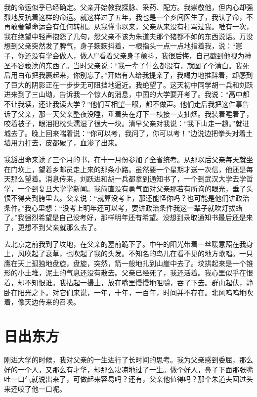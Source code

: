 \documentclass[12pt,oneside]{book}
\begin{document}
我的命运似乎已经确定。父亲开始教我探脉、采药、配方。我崇敬他，但内心却强烈地反抗着这样的命运。就这样过了五年，我也是一个乡间医生了，我认了命，不再敢奢望命运会有任何转机。从我懂事以来，父亲从来没有打骂过我。唯有一次，我在绝望中轻声抱怨了几句，怨父亲不该为朱道夫那个猪都不如的东西说话。万没想到父亲突然发了脾气，身子簌簌抖着，一根指头一点一点地指着我，说：``崽子，你还没有学会做人，做人!''看着父亲身子颤抖，我很后悔，自己戳到他视为神圣不容亵渎的东西了。当时父亲说：``我一辈子什么都没有，就图了个清白。我死后用白布把我裹起来，你别忘了。''开始有人给我提亲了，我竭力地推辞着，却感到了巨大的阴影正在一步步无可阻挡地逼近。我绝望了。这天初中同学胡一兵和刘跃进来到了三山坳，告诉我一个惊人的消息，中国的大学要开考了。我说：``高中都不让我读，还让我读大学？''他们互相望一眼，都不做声。他们走后我把这件事告诉了父亲，那一天父亲整夜没睡，垂着头在灯下一枝接一支抽烟。我装着睡着了，咬着被子，眼泪把枕头濡湿了很大一块。清早父亲对我说：``我下山走一趟。''就进城去了。晚上回来喘着说：``你可以考，我问了，你可以考！''边说边把拳头对着土墙用力打去，皮都破了，血渗了出来。

我豁出命来读了三个月的书，在十一月份参加了全省统考。从那以后父亲每天就坐在门坎上，望着乡邮员走上来的那条小路。虽然要一个星期才送一次信，他还是每天那么望着。消息传来，刘跃进和胡一兵都拿到通知书了，一个到武汉大学去学哲学，一个到复旦大学学新闻。我简直没有勇气面对父亲那若有所询的眼光，垂了头恨不得夹到胯里去。父亲说：``就算没考上，那还能怪你吗？也可能是他们讲政治条件。''我心里想：``没考上明年还可以考，要讲政治条件我这一辈子就吹灯拔蜡了。''我强烈希望是自己没考好，那样明年还有希望。没想到录取通知书最后还是来了，更想不到父亲就那么去了。

去北京之前我到了坟地，在父亲的墓前跪下了。中午的阳光带着一丝暖意照在我身上，风吹起了衰草，也吹起了我的头发。不知名的鸟儿在看不见的地方歌唱。一只鹰在天上孤独地盘旋，盘旋，突然，箭一般地扎到山崖中去了。坟拱起来是一个锥形的小土堆，泥土的气息还没有散去。父亲已经死了，我还活着。我心里似乎在恨着，却不知恨谁。我拈起一撮土，放在嘴里慢慢地咀嚼，吞了下去。群山起伏，静卧在阳光之下。对它们来说，一年，十年，一百年，时间并不存在。北风呜呜地吹着，像天边传来的召唤。


\chapter{日出东方}
刚进大学的时候，我对父亲的一生进行了长时间的思考。我为父亲感到委屈，那么好的一个人，又那么有才华，却那么凄凉地过了一生。做个好人，鼻子下面那张嘴吐一口气就说出来了，可做起来容易吗？还有，父亲他值得吗？那个朱道夫回过头来还咬了他一口呢。
\end{document}
